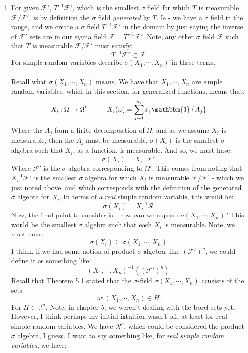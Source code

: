 \documentclass[12pt,a4paper]{article}
\newcommand{\1}[1]{\mathbbm{1}\left\{ #1 \right\}}
\newcommand{\R}{\mathbb{R}}
\newcommand{\fcal}{\mathcal{F}}
\newcommand{\rcal}{\mathcal{R}}
\begin{document}
\begin{enumerate}
	\item For given $\fcal'$, $T^{-1}\fcal'$, which is the smallest $\sigma$ field for which $T$ is measurable $\fcal/\fcal'$, is by definition the $\sigma$ field \textit{generated} by $T$. Ie - we have a $\sigma$ field in the range, and we create a $\sigma$ field $T^{-1}\fcal'$ in the domain by just saying the inverse of $\fcal'$ sets are in our sigma field $\fcal = T^{-1}\fcal'$. Note, any other $\sigma$ field $\fcal$ such that $T$ is measurable $\fcal/\fcal'$ must satisfy:
	$$
		T^{-1}\fcal' \subset \fcal
	$$
	For simple random variables describe $\sigma(X_1, \cdots, X_n)$ in these terms.
	\\\\
	Recall what $\sigma(X_1, \cdots, X_n)$ means. We have that $X_1, \cdots, X_n$ are simple random variables, which in this section, for generalized functions, means that:
	$$
		X_i: \Omega \to \Omega' \quad\quad\quad X_i(\omega) = \sum_{j=1}^{n_i} x_i \1{A_j}
	$$
	Where the $A_j$ form a finite decomposition of $\Omega$, and as we assume $X_i$ is measurable, then the $A_j$ must be measurable. $\sigma(X_i)$ is the smallest $\sigma$ algebra such that $X_i$, as a function, is measurable. And so, we must have:
	$$
		\sigma(X_i) = X_i^{-1}\fcal'
	$$
	Where $\fcal'$ is the $\sigma$ algebra corresponding to $\Omega'$. This comes from noting that $X_i^{-1}\fcal'$ is the smallest $\sigma$ algebra for which $X_i$ is measurable $\fcal/\fcal'$ - which we just noted above, and which corresponds with the definition of the generated $\sigma$ algebra for $X_i$. In terms of a \textit{real} simple random variable, this would be:
	$$
		\sigma(X_i) = X_i^{-1}\rcal
	$$
	Now, the final point to consider is - how can we express $\sigma(X_1, \cdots, X_n)$? This would be the smallest $\sigma$ algebra such that each $X_i$ is measurable. Note, we must have:
	$$
		\sigma(X_i) \subseteq \sigma(X_1, \cdots, X_n)
	$$
	I think, if we had some notion of product $\sigma$ algebra, like $(\fcal')^n$, we could define it as something like:
	$$
		(X_1,\cdots,X_n)^{-1}((\fcal')^n)
	$$
	Recall that Theorem 5.1 stated that the $\sigma$-field $\sigma(X_1, \cdots, X_n)$ consists of the sets:
	$$
		\left[\omega : (X_1, \cdots, X_n) \in H\right]
	$$
	For $H \subset \R^n$. Note, in chapter 5, we weren't dealing with the borel sets yet. However, I think perhaps my initial intuition wasn't off, at least for real simple random variables. We have $\rcal^n$, which could be considered the product $\sigma$ algebra, I guess. I want to say something like, for \textit{real simple random variables}, we have:

\end{enumerate}
\end{document}
